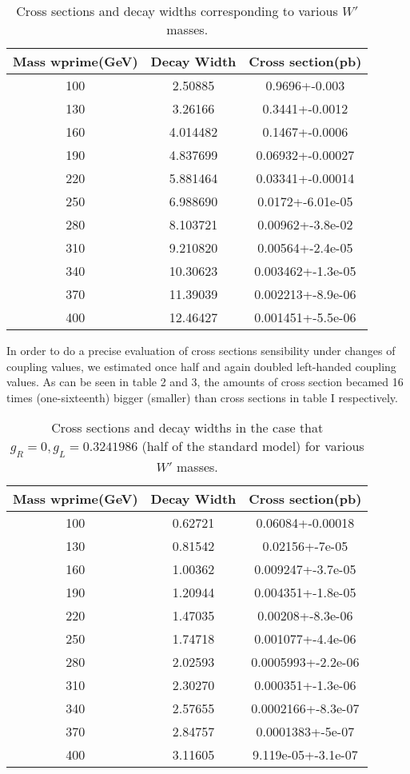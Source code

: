 \begin{table}[htb]
	\centering
\begin{tabular}{|ccc|}
\hline 
Mass wprime(GeV)  &  Decay Width  &  Cross section(pb)\\
\hline 
100 & 2.50885 & 0.9696+-0.003  \\
130 & 3.26166& 0.3441+-0.0012 \\
160 & 4.014482 &0.1467+-0.0006 \\
190 & 4.837699 &0.06932+-0.00027 \\
 220& 5.881464& 0.03341+-0.00014 \\
 250 &6.988690 &0.0172+-6.01e-05 \\
 280 &8.103721 &0.00962+-3.8e-02 \\
 310 &9.210820 &0.00564+-2.4e-05 \\
 340 &10.30623 &0.003462+-1.3e-05 \\
 370 &11.39039& 0.002213+-8.9e-06\\ 
 400 &12.46427 &0.001451+-5.5e-06\\
\hline
\end{tabular}
\caption{Cross sections and decay widths corresponding to various $W'$ masses. \label{tab1} }
\end{table}

 

 
 In order to do a precise evaluation of cross sections sensibility under changes of coupling values, we estimated once half and again doubled left-handed coupling values. As can be seen in table 2 and 3, the amounts of cross section becamed 16 times (one-sixteenth) bigger (smaller) than cross sections in table I respectively.
  \begin{table}[htb]
	\centering
\begin{tabular}{|ccc|}
\hline 
Mass wprime(GeV)  &  Decay Width  &  Cross section(pb)\\
\hline 

 100& 0.62721& 0.06084+-0.00018\\
  130& 0.81542& 0.02156+-7e-05\\
  160& 1.00362& 0.009247+-3.7e-05\\
  190& 1.20944& 0.004351+-1.8e-05\\
  220& 1.47035& 0.00208+-8.3e-06\\
  250& 1.74718 &0.001077+-4.4e-06\\
  280& 2.02593& 0.0005993+-2.2e-06\\
  310& 2.30270& 0.000351+-1.3e-06\\
 340& 2.57655& 0.0002166+-8.3e-07\\
 370& 2.84757& 0.0001383+-5e-07\\
  400& 3.11605& 9.119e-05+-3.1e-07\\ 

\hline
\end{tabular}
\caption{Cross sections and decay widths in the case that $ g_R=0 , g_L=0.3241986  $ (half of the standard model) for various $W'$ masses. \label{tab1} }
\end{table}
  

